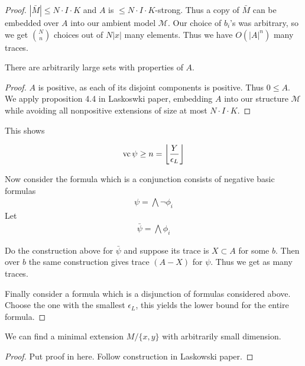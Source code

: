 \documentclass{amsart}
\newcommand{\MM}{\mathscr M}
\providecommand{\floor}[1]{\left \lfloor #1 \right \rfloor }
\begin{document}
\begin{proof}
	$|\bar M| \leq N \cdot I \cdot K$ and $A$ is $\leq N \cdot I \cdot K$-strong.
	Thus a copy of $\bar M$ can be embedded over $A$ into our ambient model $\MM$.
	Our choice of $b_i$'s was arbitrary, so we get ${N \choose n}$ choices out of $N|x|$ many elements.
	Thus we have $O(|A|^n)$ many traces.

	\begin{Lemma}
		There are arbitrarily large sets with properties of $A$.
	\end{Lemma}
	
	\begin{proof}
		$A$ is positive, as each of its disjoint components is positive. Thus $0 \leq A$.
		We apply proposition 4.4 in Laskoswki paper, embedding $A$ into our structure $\MM$ while avoiding all nonpositive extensions of size at most $N \cdot I \cdot K$.
	\end{proof}

	This shows

	\begin{align*}
		\vc \psi \geq n = \floor{\frac{Y}{\epsilon_L}}
	\end{align*}

	Now consider the formula which is a conjunction consists of negative basic formulas
	\begin{align*}
		\psi = \bigwedge \neg \phi_i
	\end{align*}
	Let
	\begin{align*}
		\bar \psi = \bigwedge \phi_i
	\end{align*}

	Do the construction above for $\bar \psi$ and suppose its trace is $X \subset A$ for some $b$.
	Then over $b$ the same construction gives trace $(A - X)$ for $\psi$. Thus we get as many traces.
	
	Finally consider a formula which is a disjunction of formulas considered above.
	Choose the one with the smallest $\epsilon_L$, this yields the lower bound for the entire formula.
\end{proof}

\begin{Claim}
	We can find a minimal extension $M / \{x, y\}$ with arbitrarily small dimension.
\end{Claim}

\begin{proof}
	Put proof in here. Follow construction in Laskowski paper.
\end{proof}
\end{document}
